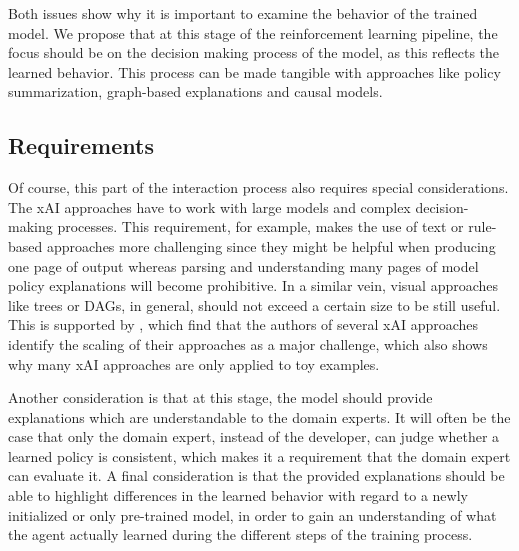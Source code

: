 \documentclass[twoside,11pt]{article}
\begin{document}
Both issues show why it is important to examine the behavior of the trained model. We propose that at this stage of the reinforcement learning pipeline, the focus should be on the decision making process of the model, as this reflects the learned behavior. This process can be made tangible with approaches like policy summarization, graph-based explanations and causal models.


\subsection{Requirements}
Of course, this part of the interaction process also requires special considerations. The xAI approaches have to work with large models and complex decision-making processes. This requirement, for example, makes the use of text or rule-based approaches \citep{TabrezHayes:2019:xRLTextualExplanations,HayesShah:2017:AutonomousPolicyExplanation} more challenging since they might be helpful when producing one page of output whereas parsing and understanding many pages of model policy explanations will become prohibitive. In a similar vein, visual approaches like trees or DAGs, in general, should not exceed a certain size to be still useful. 
This is supported by \citet{WellsBednarz:2021:xAIRLSurvey}, which find that the authors of several xAI approaches identify the scaling of their approaches as a major challenge, which also shows why many xAI approaches are only applied to toy examples. %

Another consideration is that at this stage, the model should provide explanations which are understandable to the domain experts. It will often be the case that only the domain expert, instead of the developer, can judge whether a learned policy is consistent, which makes it a requirement that the domain expert can evaluate it.
A final consideration is that the provided explanations should be able to highlight differences in the learned behavior with regard to a newly initialized or only pre-trained model, in order to gain an understanding of what the agent actually learned during the different steps of the training process.
\end{document}
